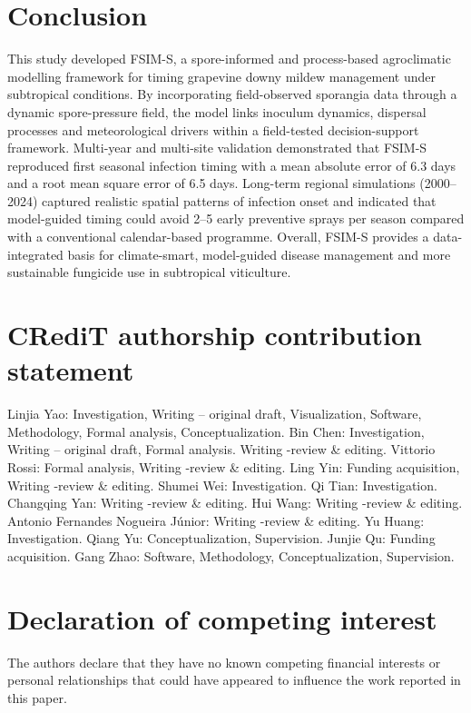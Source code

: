 \documentclass[
]{article}
\begin{document}
\section{Conclusion}\label{conclusion}

This study developed FSIM-S, a spore-informed and process-based
agroclimatic modelling framework for timing grapevine downy mildew
management under subtropical conditions. By incorporating
field-observed sporangia data through a dynamic spore-pressure field,
the model links inoculum dynamics, dispersal processes and
meteorological drivers within a field-tested decision-support framework.
Multi-year and multi-site validation demonstrated that FSIM-S reproduced
first seasonal infection timing with a mean absolute error of 6.3 days
and a root mean square error of 6.5 days. Long-term regional simulations
(2000--2024) captured realistic spatial patterns of infection onset and
indicated that model-guided timing could avoid 2--5 early preventive
sprays per season compared with a conventional calendar-based programme.
Overall, FSIM-S provides a
data-integrated basis for climate-smart, model-guided disease management
and more sustainable fungicide use in subtropical viticulture.

\section{CRediT authorship contribution
statement}\label{credit-authorship-contribution-statement}

Linjia Yao: Investigation, Writing -- original draft, Visualization,
Software, Methodology, Formal analysis, Conceptualization. Bin Chen:
Investigation, Writing -- original draft, Formal analysis. Writing
-review \& editing. Vittorio Rossi: Formal analysis, Writing -review \&
editing. Ling Yin: Funding acquisition, Writing -review \& editing.
Shumei Wei: Investigation. Qi Tian: Investigation. Changqing Yan:
Writing -review \& editing. Hui Wang: Writing -review \& editing.
Antonio Fernandes Nogueira Júnior: Writing -review \& editing. Yu Huang:
Investigation. Qiang Yu: Conceptualization, Supervision. Junjie Qu:
Funding acquisition. Gang Zhao: Software, Methodology,
Conceptualization, Supervision.

\section{Declaration of competing
interest}\label{declaration-of-competing-interest}

The authors declare that they have no known competing financial
interests or personal relationships that could have appeared to
influence the work reported in this paper.
\end{document}
